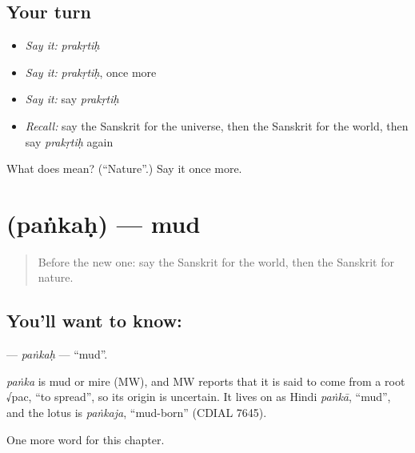 \subsection*{Your turn}
\begin{itemize}
\raggedright
  \item \emph{Say it:} \emph{prakṛtiḥ}
  \item \emph{Say it:} \emph{prakṛtiḥ}, once more
  \item \emph{Say it:} say \emph{prakṛtiḥ}
  \item \emph{Recall:} say the Sanskrit for the universe, then the Sanskrit for the world, then say \emph{prakṛtiḥ} again
\end{itemize}

\begin{tcolorbox}[breakable,colback=teal!4,colframe=teal!35!black,title={Before you move on}]
What does  mean? (\textquotedblleft{}Nature\textquotedblright{}.) Say it once more.
\end{tcolorbox}
\section[\texorpdfstring{\sk{पंकः} (paṅkaḥ)}{पंकः (paṅkaḥ)}]{ (paṅkaḥ) — mud}

\label{lesson:SA-C251-pankah}



\begin{quote}
Before the new one: say the Sanskrit for the world, then the Sanskrit for nature.
\end{quote}

\subsection*{You'll want to know: }
\textbf{} — \emph{paṅkaḥ} — \textquotedblleft{}mud\textquotedblright{}.

\begin{cousinweb}
\emph{paṅka} is mud or mire (MW), and MW reports that it is said to come from a root √pac, \textquotedblleft{}to spread\textquotedblright{}, so its origin is uncertain. It lives on as Hindi \emph{paṅkā}, \textquotedblleft{}mud\textquotedblright{}, and the lotus is \emph{paṅkaja}, \textquotedblleft{}mud-born\textquotedblright{} (CDIAL 7645).
\end{cousinweb}

\begin{grammarlens}[title={What you've built}]
One more word for this chapter.
\end{grammarlens}

